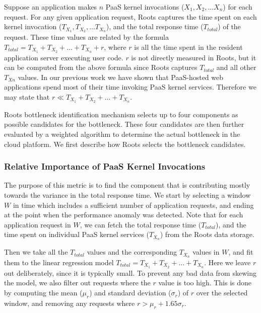 Suppose an application makes $n$ PaaS kernel invocations ($X_1, X_2, ... X_n$) for each request. 
For any given application request,
Roots captures the time spent on each kernel invocation ($T_{X_1}, T_{X_2}, ... T_{X_n}$), and the 
total response time ($T_{total}$) of the request. These time values are related by the formula
$T_{total} = T_{X_1} + T_{X_2} + ... + T_{X_n} + r$, where $r$ is all the time spent in the resident 
application server executing user code. $r$ is not
directly measured in Roots, but it can be computed from the above formula 
since Roots captures $T_{total}$ and all other $T_{Xn}$ values. In our previous
work we have shown that PaaS-hosted web applications spend most of their time invoking PaaS kernel services.
Therefore we may state that $r \ll T_{X_1} + T_{X_2} + ... + T_{X_n}$.

Roots bottleneck identification mechanism selects up to four components as possible candidates
for the bottleneck. These four candidates are then further evaluated by a weighted algorithm to
determine the actual bottleneck in the cloud platform. We first describe how Roots selects the
bottleneck candidates.

\subsubsection{Relative Importance of PaaS Kernel Invocations} 
The purpose of this metric is to find the component that is contributing mostly towards the variance in the total
response time. We start by selecting a window $W$ in time which includes a sufficient number of application requests,
and ending at the point when the performance anomaly was detected. Note that for each application request
in $W$, we can fetch the total response time ($T_{total}$), and the time spent on individual PaaS kernel
services ($T_{X_n}$) from the Roots data storage.

Then we take all the $T_{total}$ values
and the corresponding $T_{X_n}$ values in $W$, and fit them to the linear regression model
$T_{total} = T_{X_1} + T_{X_2} + ... + T_{X_n}$. Here we leave $r$ out deliberately, since it is typically small. To prevent
any bad data from skewing the model, we also filter out requests where the $r$ value is too high. This
is done by computing the mean ($\mu_r$) and standard deviation ($\sigma_r$) of $r$ over the selected window, and removing 
any requests where $r > \mu_r + 1.65\sigma_r$.

